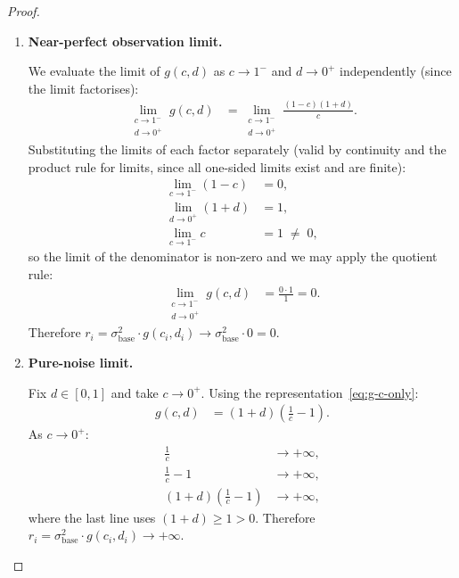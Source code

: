\documentclass[12pt,openany]{book}
\numberwithin{equation}{chapter}
\theoremstyle{plain}
\theoremstyle{definition}
\theoremstyle{remark}
\begin{document}
\begin{proof}
\begin{enumerate}
  \textbf{Boundary case $c_i = 1$.}  When $c_i = 1$,
  $g(1,d) = 0$ for all $d$; the map $d \mapsto g(1,d)$ is
  identically zero and hence not strictly increasing.  However,
  by Assumption~\ref{asm:conf-doubt}, $c_i \in (0,1]$; the
  statement of Part~3 explicitly restricts to $c_i \in (0,1)$,
  so this degenerate case is excluded.

  \item \textbf{Near-perfect observation limit.}

  We evaluate the limit of $g(c,d)$ as $c \to 1^{-}$ and
  $d \to 0^{+}$ independently (since the limit factorises):
  \begin{align}
    \lim_{\substack{c \to 1^{-} \\ d \to 0^{+}}} g(c,d)
    &= \lim_{\substack{c \to 1^{-} \\ d \to 0^{+}}}
       \frac{(1-c)(1+d)}{c}.
    \label{eq:limit-setup}
  \end{align}
  Substituting the limits of each factor separately (valid by
  continuity and the product rule for limits, since all
  one-sided limits exist and are finite):
  \begin{align}
    \lim_{c \to 1^{-}} (1-c) &= 0,
    \label{eq:lim-1-minus-c}\\
    \lim_{d \to 0^{+}} (1+d) &= 1,
    \label{eq:lim-1-plus-d}\\
    \lim_{c \to 1^{-}} c &= 1 \;\neq\; 0,
    \label{eq:lim-c}
  \end{align}
  so the limit of the denominator is non-zero and we may apply
  the quotient rule:
  \begin{align}
    \lim_{\substack{c \to 1^{-} \\ d \to 0^{+}}} g(c,d)
    &= \frac{0 \cdot 1}{1} = 0.
    \label{eq:limit-zero}
  \end{align}
  Therefore $r_i = \sigma_{\mathrm{base}}^2 \cdot g(c_i,d_i)
  \to \sigma_{\mathrm{base}}^2 \cdot 0 = 0$.

  \item \textbf{Pure-noise limit.}

  Fix $d \in [0,1]$ and take $c \to 0^{+}$.  Using the
  representation~\eqref{eq:g-c-only}:
  \begin{align}
    g(c,d)
    &= (1+d)\!\left(\frac{1}{c} - 1\right).
    \label{eq:g-rep-limit}
  \end{align}
  As $c \to 0^{+}$:
  \begin{align}
    \frac{1}{c} &\to +\infty,
    \label{eq:recip-infty}\\
    \frac{1}{c} - 1 &\to +\infty,
    \label{eq:recip-minus-1-infty}\\
    (1+d)\!\left(\frac{1}{c} - 1\right)
    &\to +\infty,
    \label{eq:g-infty}
  \end{align}
  where the last line uses $(1+d) \geq 1 > 0$.  Therefore
  $r_i = \sigma_{\mathrm{base}}^2 \cdot g(c_i, d_i) \to
  +\infty$.


\end{enumerate}
\end{proof}
\end{document}
